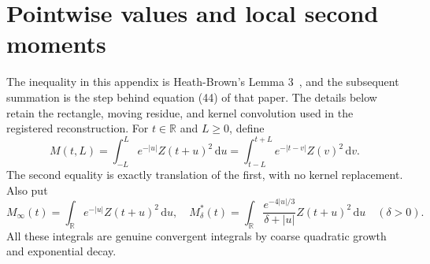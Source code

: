 \documentclass[11pt,a4paper]{article}
\numberwithin{equation}{section}
\theoremstyle{definition}
\newcommand{\R}{\mathbb R}
\newcommand{\dd}{\,\mathrm d}
\newcommand{\zabs}{Z}
\begin{document}
\section{Pointwise values and local second moments}
\label{sec:pointmean}
The inequality in this appendix is Heath-Brown's Lemma 3~\cite{hb78},
and the subsequent summation is the step behind equation (44) of that paper.
The details below retain the rectangle, moving residue, and kernel convolution
used in the registered reconstruction.
For $t\in\R$ and $L\ge0$, define
\[
 M(t,L)=\int_{-L}^{L}e^{-|u|}\zabs(t+u)^2\dd u
       =\int_{t-L}^{t+L}e^{-|t-v|}\zabs(v)^2\dd v.
\]
The second equality is exactly translation of the first, with no kernel
replacement. Also put
\[
 M_\infty(t)=\int_{\R}e^{-|u|}\zabs(t+u)^2\dd u,\quad
 M_\delta^*(t)=\int_{\R}\frac{e^{-4|u|/3}}{\delta+|u|}\zabs(t+u)^2\dd u
 \quad(\delta>0).
\]
All these integrals are genuine convergent integrals by coarse quadratic growth
and exponential decay.
\end{document}
